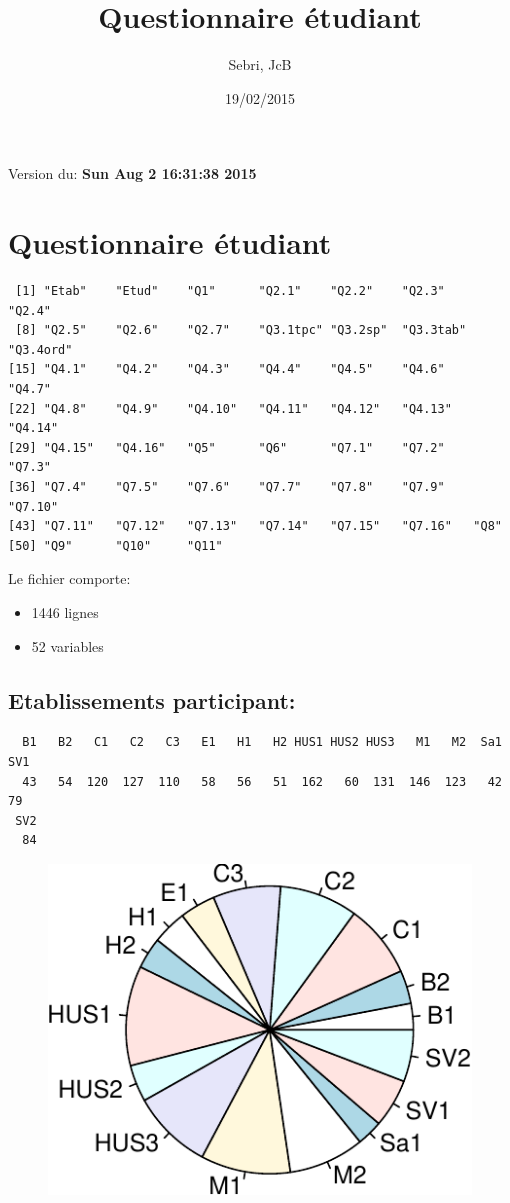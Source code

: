 \documentclass[]{article}
\title{Questionnaire étudiant}
\author{Sebri, JcB}
\date{19/02/2015}
\begin{document}
\maketitle


{
\hypersetup{linkcolor=black}
\setcounter{tocdepth}{2}
\tableofcontents
}
Version du: \textbf{Sun Aug 2 16:31:38 2015}

\section{Questionnaire étudiant}\label{questionnaire-etudiant}

\begin{verbatim}
 [1] "Etab"    "Etud"    "Q1"      "Q2.1"    "Q2.2"    "Q2.3"    "Q2.4"   
 [8] "Q2.5"    "Q2.6"    "Q2.7"    "Q3.1tpc" "Q3.2sp"  "Q3.3tab" "Q3.4ord"
[15] "Q4.1"    "Q4.2"    "Q4.3"    "Q4.4"    "Q4.5"    "Q4.6"    "Q4.7"   
[22] "Q4.8"    "Q4.9"    "Q4.10"   "Q4.11"   "Q4.12"   "Q4.13"   "Q4.14"  
[29] "Q4.15"   "Q4.16"   "Q5"      "Q6"      "Q7.1"    "Q7.2"    "Q7.3"   
[36] "Q7.4"    "Q7.5"    "Q7.6"    "Q7.7"    "Q7.8"    "Q7.9"    "Q7.10"  
[43] "Q7.11"   "Q7.12"   "Q7.13"   "Q7.14"   "Q7.15"   "Q7.16"   "Q8"     
[50] "Q9"      "Q10"     "Q11"    
\end{verbatim}

Le fichier comporte:

\begin{itemize}
\itemsep1pt\parskip0pt
\item
  1446 lignes
\item
  52 variables
\end{itemize}

\subsection{Etablissements
participant:}\label{etablissements-participant}

\begin{verbatim}
  B1   B2   C1   C2   C3   E1   H1   H2 HUS1 HUS2 HUS3   M1   M2  Sa1  SV1 
  43   54  120  127  110   58   56   51  162   60  131  146  123   42   79 
 SV2 
  84 
\end{verbatim}

\begin{figure}[htbp]
\centering
\includegraphics{qs_etudiants_files/figure-latex/participants-1.pdf}
\end{figure}
\end{document}
